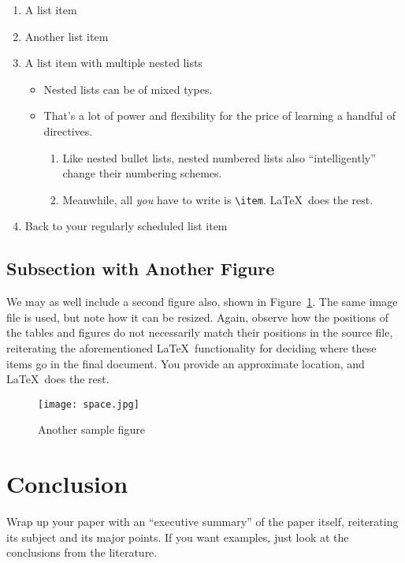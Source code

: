 \documentclass{article}
\begin{document}
\begin{enumerate}
\item A list item
\item Another list item
\item A list item with multiple nested lists

\begin{itemize}
\item Nested lists can be of mixed types.
\item That's a lot of power and flexibility for the price of learning a handful of directives.

\begin{enumerate}
\item Like nested bullet lists, nested numbered lists also ``intelligently'' change their numbering schemes.
\item Meanwhile, all \emph{you} have to write is \verb!\item!.  \LaTeX\ does the rest.
\end{enumerate}
\end{itemize}

\item Back to your regularly scheduled list item

\end{enumerate}

\subsection{Subsection with Another Figure}

We may as well include a second figure also, shown in Figure~\ref{figure-sample2}.  The same image file is used, but note how it can be resized.  Again, observe how the positions of the tables and figures do not necessarily match their positions in the source file, reiterating the aforementioned \LaTeX\ functionality for deciding where these items go in the final document.  You provide an approximate location, and \LaTeX\ does the rest.

\begin{figure}
\centering
\texttt{[image: space.jpg]} 

\caption{Another sample figure}
\label{figure-sample2}
\end{figure}

\section{Conclusion}

Wrap up your paper with an ``executive summary'' of the paper itself, reiterating its subject and its major points.  If you want examples, just look at the conclusions from the literature.



\end{document}
